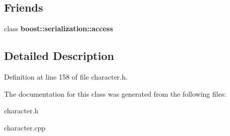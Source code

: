 \subsection*{Friends}
\begin{DoxyCompactItemize}
\item 
\hypertarget{class_n_p_c_ac98d07dd8f7b70e16ccb9a01abf56b9c}{}\label{class_n_p_c_ac98d07dd8f7b70e16ccb9a01abf56b9c} 
class {\bfseries boost\+::serialization\+::access}
\end{DoxyCompactItemize}


\subsection{Detailed Description}


Definition at line 158 of file character.\+h.



The documentation for this class was generated from the following files\+:\begin{DoxyCompactItemize}
\item 
character.\+h\item 
character.\+cpp\end{DoxyCompactItemize}

